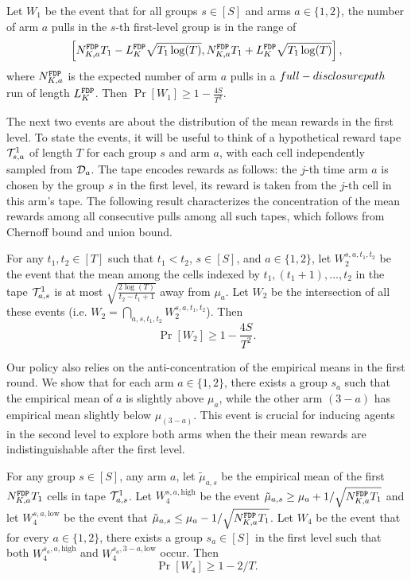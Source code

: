 \begin{lemma}\label{3levelw1}
  Let $W_1$ be the event that for all groups $s\in [S]$ and arms
  $a\in \{1, 2\}$, the number of arm $a$ pulls in the $s$-th
  first-level group is in the range of
  $$
  \left[N^\mathtt{FDP}_{K,a}  T_1- L^\mathtt{FDP}_K \sqrt{T_1\log(T)}, N^\mathtt{FDP}_{K,a}  T_1 + L^\mathtt{FDP}_K \sqrt{T_1\log(T)}\right],
  $$
  where $N^\mathtt{FDP}_{K,a} $ is the expected number of arm $a$ pulls in a $full-disclosure path$ run
  of length $L^\mathtt{FDP}_K$. Then $\Pr[W_1] \geq 1- \frac{4S}{T^2}$.
\end{lemma}


The next two events are about the distribution of the mean rewards in
the first level. To state the events, it will be useful to think of a
hypothetical reward tape $\mathcal{T}^1_{s, a}$ of length $T$ for each
group $s$ and arm $a$, with each cell independently sampled from
$\mathcal{D}_a$.  The tape encodes rewards as follows: the $j$-th time arm $a$
is chosen by the group $s$ in the first level, its reward is taken
from the $j$-th cell in this arm's tape. The following result
characterizes the concentration of the mean rewards among all
consecutive pulls among all such tapes, which follows from Chernoff
bound and union bound.

\begin{lemma}\label{3levelw2}
  For any $t_1, t_2\in [T]$ such that $t_1 < t_2$, $s\in [S]$, and
  $a\in \{1,2\}$, let $W_2^{s,a,t_1,t_2}$ be the event that the mean
  among the cells indexed by $t_1, (t_1+1), \ldots, t_2$ in the tape
  $\mathcal{T}^1_{a, s}$ is at most $\sqrt{\frac{2\log(T)}{t_2-t_1+1}}$ away
  from $\mu_a$.  Let $W_2$ be the intersection of all these events
  (i.e.  $W_2 = \bigcap_{a,s,t_1,t_2} W_2^{s,a,t_1,t_2}$). Then
  \[
    \Pr[W_2] \geq 1- \frac{4S}{T^2}.
  \]
\end{lemma}

Our policy also relies on the anti-concentration of the empirical
means in the first round. We show that for each arm $a\in \{1, 2\}$,
there exists a group $s_a$ such that the empirical mean of $a$ is
slightly above $\mu_a$, while the other arm $(3 - a)$ has empirical
mean slightly below $\mu_{(3-a)}$. This event is crucial for inducing
agents in the second level to explore both arms when the their
mean rewards are indistinguishable after the first level.


\begin{lemma}\label{3levelw4}
  For any group $s\in [S]$, any arm $a$, let $\tilde\mu_{a,s}$ be the
  empirical mean of the first $N^\mathtt{FDP}_{K,a}  T_1$ cells in tape $\mathcal{T}^1_{a, s}$.
  Let $W_4^{s,a,\text{high}}$ be the event
  $\tilde\mu_{a, s} \geq \mu_a + 1/\sqrt{N^\mathtt{FDP}_{K,a}  T_1}$ and let
  $W_4^{s,a,\text{low}}$ be the event that
  $\tilde\mu_{a, s} \leq \mu_a - 1/\sqrt{N^\mathtt{FDP}_{K,a}  T_1}$.  Let $W_4$ be the
  event that for every $a\in \{1, 2\}$, there exists a group
  $s_a\in [S]$ in the first level such that both $W_4^{s_a,a,\text{high}}$
  and $W_4^{s_a,3-a,\text{low}}$ occur. Then
  \[
    \Pr[W_4]\geq 1 -2 /T.
  \]
\end{lemma}




